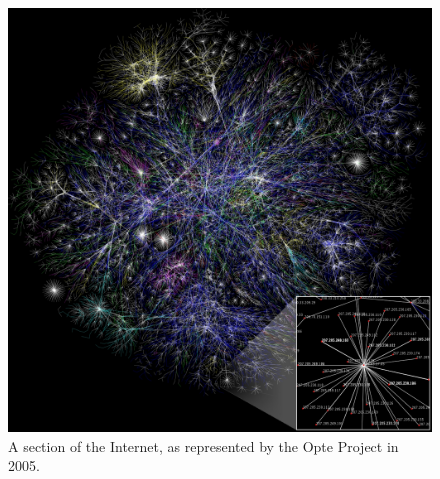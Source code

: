 \begin{figure}[!h]
	\begin{center}
		\includegraphics[scale=0.2]{images/Internet_map_1024.jpg}
	\end{center}
	\caption{A section of the Internet, as represented by the Opte Project in 2005.}
	\label{logo}
\end{figure}



